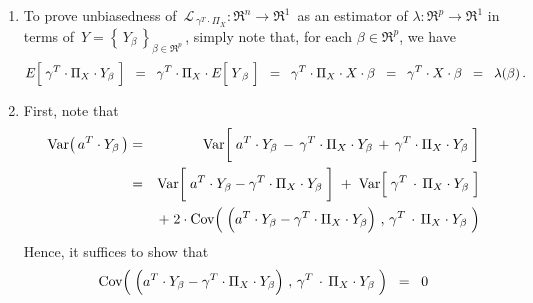 \begin{enumerate}
\item
	To prove unbiasedness of
	\,$\mathcal{L}_{\,\gamma^{T} \cdot \Pi_{X}} : \Re^{n} \longrightarrow \Re^{1}$\,
	as an estimator of $\lambda : \Re^{p} \longrightarrow \Re^{1}$
	in terms of \,$Y = \left\{\,Y_{\beta}\,\right\}_{\beta\in\Re^{p}}$\,,
	simply note that, for each $\beta \in \Re^{p}$, we have
	\begin{equation*}
	E\!\left[\;\gamma^{T} \cdot \overset{{\color{white}.}}{\Pi}_{X} \cdot Y_{\beta}\;\right]
	\;\; = \;\;
		\gamma^{T} \cdot \Pi_{X} \cdot E\!\left[\;\overset{{\color{white}.}}{Y}_{\beta}\;\right]
	\;\; = \;\;
		\gamma^{T} \cdot \Pi_{X} \cdot X \cdot \beta
	\;\; = \;\;
		\gamma^{T} \cdot X \cdot \beta
	\;\; = \;\;
		\lambda(\beta)\,.
	\end{equation*}
\item
	First, note that
	\begin{eqnarray*}
	\Var\!\left(\,a^{T} \cdot Y_{\beta}\,\right)
	&=&
		\Var\!\left[\;
			a^{T} \cdot Y_{\beta}
			\,\overset{{\color{white}+}}{-}\,
			\gamma^{T} \cdot \Pi_{X} \cdot Y_{\beta}
			\,+\,
			\gamma^{T} \cdot \Pi_{X} \cdot Y_{\beta}
			\;\right]
	\\
	&=&
		\Var\!\left[\;
			a^{T} \cdot Y_{\beta}
			\overset{{\color{white}+}}{-}
			\gamma^{T} \cdot \Pi_{X} \cdot Y_{\beta}
				\;\right]
		\; + \;
		\Var\!\left[\;
			\gamma^{T} \overset{{\color{white}+}}{\cdot} \Pi_{X} \cdot Y_{\beta}
			\;\right]
	\\
	&&	+ \;
		2\cdot\Cov\!\left(\;
			\left(a^{T} \cdot Y_{\beta}
			\overset{{\color{white}.}}{-}
			\gamma^{T} \cdot \Pi_{X} \cdot Y_{\beta}\right)
			\,,\,
			\gamma^{T} \overset{{\color{white}+}}{\cdot} \Pi_{X} \cdot Y_{\beta}
			\;\right)
	\end{eqnarray*}
	Hence, it suffices to show that
	\begin{equation*}
		\Cov\!\left(\;
			\left(a^{T} \cdot Y_{\beta}
			\overset{{\color{white}.}}{-}
			\gamma^{T} \cdot \Pi_{X} \cdot Y_{\beta}\right)
			\,,\,
			\gamma^{T} \overset{{\color{white}+}}{\cdot} \Pi_{X} \cdot Y_{\beta}
			\;\right)
		\;\; = \;\; 0
	\end{equation*}
	

\end{enumerate}
